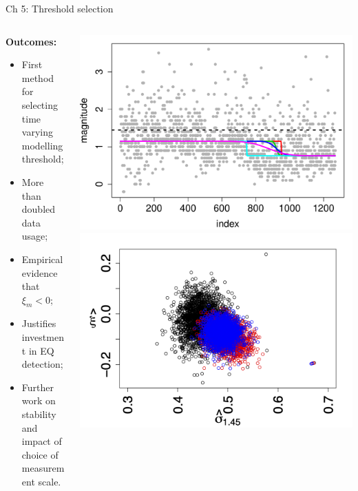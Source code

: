 \documentclass[10pt]{beamer}
\begin{document}
\begin{frame}{Ch 5: Threshold selection}
\begin{columns}
\begin{column}{0.6\textwidth}
\textbf{Outcomes:} 
\vspace{1em}
\begin{itemize}
\item First method for selecting time varying modelling threshold; \\[1em]
\item More than doubled data usage;\\[1em]
\item Empirical evidence that $\xi_m < 0$; \\[1em]
\item Justifies investment in EQ detection; \\[1em]
\item Further work on stability and impact of choice of measurement scale. 
\end{itemize}
\end{column}
\begin{column}{0.4\textwidth}
\begin{center}
    \includegraphics[width = \textwidth, page = 2]{BO_selected_thresholds_restricted.pdf}
    \includegraphics[width = \textwidth]{parameter_comparison_cons_flat_sigmoid.png}

\end{center}
\end{column}
\end{columns}
\end{frame}
\end{document}
